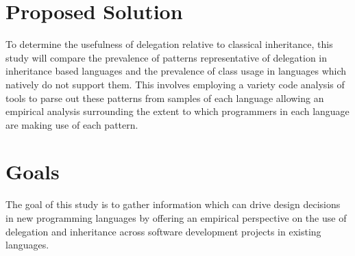 \section{Proposed Solution}
To determine the usefulness of delegation relative to classical inheritance, this study will compare the prevalence of patterns representative of delegation in inheritance based languages and the prevalence of class usage in languages which natively do not support them. This involves employing a variety code analysis of tools to parse out these patterns from samples of each language allowing an empirical analysis surrounding the extent to which programmers in each language are making use of each pattern.

\section{Goals}
The goal of this study is to gather information which can drive design decisions in new programming languages by offering an empirical perspective on the use of delegation and inheritance across software development projects in existing languages. 